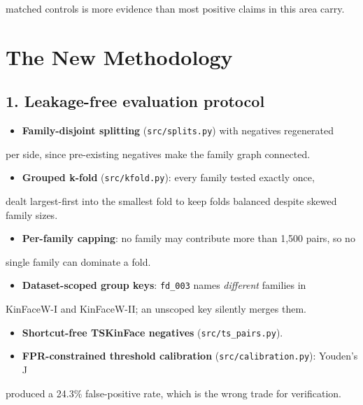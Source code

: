 \documentclass[11pt,a4paper]{article}
\begin{document}
   matched controls is more evidence than most positive claims in this area
   carry.



\section*{The New Methodology}

\subsection*{1. Leakage-free evaluation protocol}

\begin{itemize}\setlength{\itemsep}{2pt}
\item \textbf{Family-disjoint splitting} (\texttt{src/splits.py}) with negatives regenerated
\end{itemize}

  per side, since pre-existing negatives make the family graph connected.
\begin{itemize}\setlength{\itemsep}{2pt}
\item \textbf{Grouped k-fold} (\texttt{src/kfold.py}): every family tested exactly once,
\end{itemize}

  dealt largest-first into the smallest fold to keep folds balanced despite
  skewed family sizes.
\begin{itemize}\setlength{\itemsep}{2pt}
\item \textbf{Per-family capping}: no family may contribute more than 1,500 pairs, so no
\end{itemize}

  single family can dominate a fold.
\begin{itemize}\setlength{\itemsep}{2pt}
\item \textbf{Dataset-scoped group keys}: \texttt{fd\_003} names \emph{different} families in
\end{itemize}

  KinFaceW-I and KinFaceW-II; an unscoped key silently merges them.
\begin{itemize}\setlength{\itemsep}{2pt}
\item \textbf{Shortcut-free TSKinFace negatives} (\texttt{src/ts\_pairs.py}).
\item \textbf{FPR-constrained threshold calibration} (\texttt{src/calibration.py}): Youden's J
\end{itemize}

  produced a 24.3\% false-positive rate, which is the wrong trade for
  verification.
\end{document}
